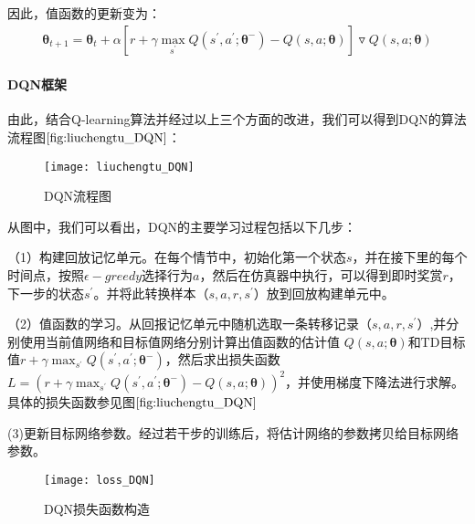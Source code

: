 因此，值函数的更新变为：
\begin{displaymath}
\begin{aligned}
\mathbf{\theta}_{t+1}=\mathbf{\theta}_{t}+\alpha[r+\gamma \max_{s^{'}}Q(s^{'},a^{'};\mathbf{\theta^{-}})-Q(s,a;\mathbf{\theta})]\triangledown Q(s,a;\mathbf{\theta})
\end{aligned}
\end{displaymath}

 \paragraph{DQN框架}
 由此，结合Q-learning算法并经过以上三个方面的改进，我们可以得到DQN的算法流程图$\ref{fig:liuchengtu_DQN}$：
\begin{figure}[htbp]
\centering
\texttt{[image: liuchengtu\_DQN]}
\caption{DQN流程图}
\label{fig:liuchengtu_DQN}
\end{figure}

从图中，我们可以看出，DQN的主要学习过程包括以下几步：

（1）构建回放记忆单元。在每个情节中，初始化第一个状态$s$，并在接下里的每个时间点，按照$\epsilon-greedy$选择行为$a$，然后在仿真器中执行，可以得到即时奖赏$r$，下一步的状态$s^{'}$。并将此转换样本（$s,a,r,s^{'}$）放到回放构建单元中。

（2）值函数的学习。从回报记忆单元中随机选取一条转移记录（$s,a,r,s^{'}$）,并分别使用当前值网络和目标值网络分别计算出值函数的估计值 $Q(s,a;\mathbf{\theta})$和TD目标值$r+\gamma \max_{s^{'}}Q(s^{'},a^{'};\mathbf{\theta^{-}})$，然后求出损失函数$L=(r+\gamma \max_{s^{'}}Q(s^{'},a^{'};\mathbf{\theta^{-}})-Q(s,a;\mathbf{\theta}))^{2}$，并使用梯度下降法进行求解。具体的损失函数参见图$\ref{fig:liuchengtu_DQN}$

(3)更新目标网络参数。经过若干步的训练后，将估计网络的参数拷贝给目标网络参数。

\begin{figure}[htbp]
\centering
\texttt{[image: loss\_DQN]}
\caption{DQN损失函数构造}
\label{fig:loss_DQN}
\end{figure}

